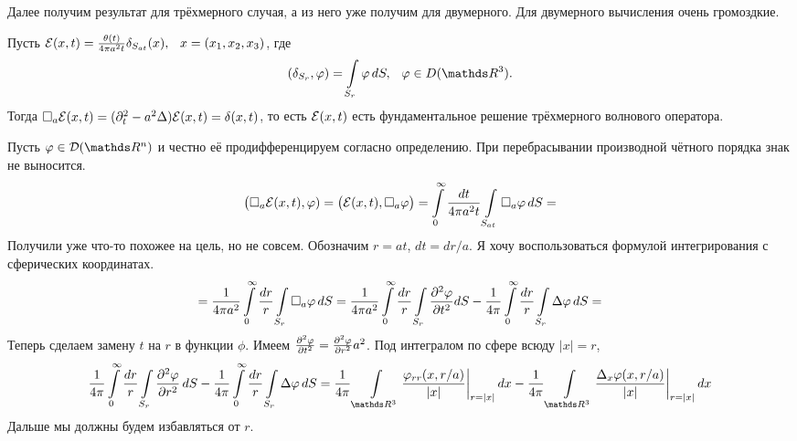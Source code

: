 Далее получим результат для трёхмерного случая, а из него уже получим для двумерного. Для двумерного вычисления очень громоздкие.
\begin{The}
  Пусть $\mathcal E(x,t) = \frac{\theta(t)}{4\pi a^2 t}\delta_{S_{at}}(x),\hskip .75em plus.1em minus.08em\relax x = (x_1,x_2,x_3)$, где
\[
  (\delta_{S_r},\phi) = \int\limits_{S_r}\phi\,dS,\pau \phi\in D(\R^3).
\]
Тогда $\square_a\mathcal E(x,t) = (\partial^2_t - a^2\Delta)\mathcal E(x,t) = \delta(x,t)$, то есть $\mathcal E(x,t)$ есть фундаментальное решение трёхмерного волнового оператора.
\end{The}
\begin{Proof}
  Пусть $\phi\in\D(\R^n)$ и честно её продифференцируем согласно определению. При перебрасывании производной чётного порядка знак не выносится.
\[
  \big(\square_a\mathcal E(x,t),\varphi) = \big(\mathcal E(x,t),\square_a\varphi\big) = 
  \int\limits_0^\infty \frac{dt}{4\pi a^2 t}\int\limits_{S_{at}}\square_a\varphi\,dS = 
\]
Получили уже что-то похожее на цель, но не совсем. Обозначим $r=at$, $dt = dr/a$. Я хочу воспользоваться формулой интегрирования с сферических координатах. 
\[
  = \frac1{4\pi a^2}\int\limits_0^\infty \frac{dr}r\int\limits_{S_r}\square_a\varphi\,dS = 
  \frac1{4\pi a^2}\int\limits_0^\infty\frac{dr}r\int\limits_{S_r}\frac{\partial ^2\varphi}{\partial t^2}dS - 
    \frac1{4\pi}\int\limits_0^\infty\frac{dr}r\int\limits_{S_r}\Delta\varphi\,dS = 
\]
Теперь сделаем замену $t$ на $r$ в функции $\phi$. Имеем $\frac{\partial ^2\varphi}{\partial t^2} = \frac{\partial ^2\varphi}{\partial r^2} a^2$. Под интегралом по сфере всюду $|x| = r$,
\[
  \frac1{4\pi}\int\limits_0^\infty\frac{dr}r\Gint{S_r}\CP{^2\phi}{r^2}\,dS - 
   \frac1{4\pi}\int\limits_0^\infty\frac{dr}r\Gint{S_r}\Delta\phi\,dS = 
  \frac1{4\pi}\Gint{\R^3}\frac{\phi_{rr}(x,r/a)}{|x|}\bigg|_{r=|x|}\,dx - 
   \frac1{4\pi}\Gint{\R^3}   \frac{\Delta_x\phi(x,r/a)}{|x|}\bigg|_{r=|x|}\,dx
\]
Дальше мы должны будем избавляться от $r$.
\end{Proof}
